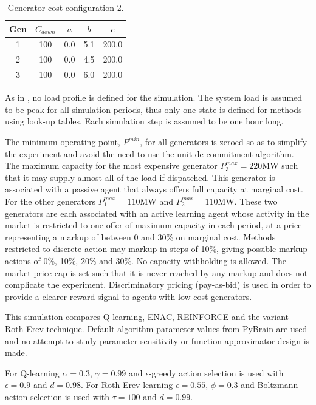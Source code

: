 \begin{table}
\begin{center}
\begin{tabular}{c|c|c|c|c}
\hline
Gen &$C_{down}$ &$a$ &$b$ &$c$ \\
\hline\hline
 1 &100 &0.0 &5.1 &200.0 \\
 2 &100 &0.0 &4.5 &200.0 \\
 3 &100 &0.0 &6.0 &200.0 \\
\hline
\end{tabular}
\caption{Generator cost configuration 2.}
\label{tbl:case6ww_gencost2}
\end{center}
\end{table}

As in , no load profile is defined for the simulation.
The system load is assumed to be peak for all simulation periods, thus only one state is defined for methods
using look-up tables.  Each simulation step is assumed to be one hour long.

The minimum operating point, $P^{min}$, for all generators is zeroed so as to
simplify the experiment and avoid the need to use the unit de-commitment
algorithm.  The maximum capacity for the most expensive generator
$P^{max}_3=220$MW such that it may supply almost all of the load if dispatched.
This generator is associated with a passive agent that always offers full
capacity at marginal cost.  For the other generators $P^{max}_1=110$MW and
$P^{max}_2=110$MW.  These two generators are each associated with an active
learning agent whose activity in the market is restricted to one offer of
maximum capacity in each period, at a price representing a markup of between 0
and 30\% on marginal cost.  Methods restricted to discrete action may markup in
steps of 10\%, giving possible markup actions of 0\%, 10\%, 20\% and 30\%.  No
capacity withholding is allowed.  The market price cap is set such that it is
never reached by any markup and does not complicate the experiment.
Discriminatory pricing (pay-as-bid) is used in order to provide a clearer reward
signal to agents with low cost generators.

This simulation compares Q-learning, ENAC, REINFORCE and the variant Roth-Erev
technique.  Default algorithm parameter values from PyBrain are used and no
attempt to study parameter sensitivity or function approximator design is made.

For Q-learning $\alpha=0.3$, $\gamma=0.99$ and $\epsilon$-greedy action
selection is used with $\epsilon=0.9$ and $d=0.98$. For Roth-Erev learning
$\epsilon=0.55$, $\phi=0.3$ and Boltzmann action selection is used with
$\tau=100$ and $d=0.99$.

